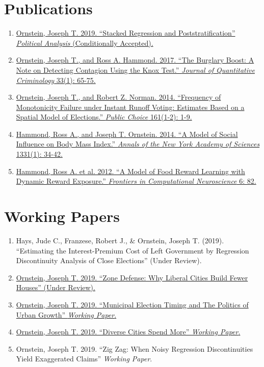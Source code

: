 \documentclass[letterpaper]{article}
\begin{document}
\hrulefill

\section*{Publications}
\begin{enumerate}
\item \href{https://joeornstein.github.io/SRP.html}{Ornstein, Joseph T. 2019. ``Stacked Regression and Poststratification'' \textit{Political Analysis} (Conditionally Accepted).} 
\item \href{https://joeornstein.github.io/papers/Ornstein-Hammond2017.pdf}{Ornstein, Joseph T., and Ross A. Hammond. 2017. ``The Burglary Boost: A Note on Detecting Contagion Using the Knox Test.'' \textit{Journal of Quantitative Criminology} 33(1): 65-75.}
\item \href{https://joeornstein.github.io/MonotonicityFailure.html}{Ornstein, Joseph T., and Robert Z. Norman. 2014. ``Frequency of Monotonicity Failure under Instant Runoff Voting: Estimates Based on a Spatial Model of Elections.'' \textit{Public Choice} 161(1-2): 1-9.}
\item \href{https://joeornstein.github.io/papers/Hammond_et_al-2014-Annals_of_the_New_York_Academy_of_Sciences.pdf}{Hammond, Ross A., and Joseph T. Ornstein. 2014. ``A Model of Social Influence on Body Mass Index.'' \textit{Annals of the New York Academy of Sciences} 1331(1): 34-42.}
\item \href{https://joeornstein.github.io/papers/Hammond-2012.pdf}{Hammond, Ross A. et al. 2012. ``A Model of Food Reward Learning with Dynamic Reward Exposure.'' \textit{Frontiers in Computational Neuroscience} 6: 82.}
\end{enumerate}

\hrulefill
\section*{Working Papers}
\begin{enumerate}
\item Hays, Jude C., Franzese, Robert J., \& Ornstein, Joseph T. (2019). ``Estimating the Interest-Premium Cost of Left Government by Regression Discontinuity Analysis of Close Elections'' (Under Review).
\item \href{https://joeornstein.github.io/papers/ornstein-zone-defense.pdf}{Ornstein, Joseph T. 2019. ``Zone Defense: Why Liberal Cities Build Fewer Houses'' (Under Review).}
\item \href{https://joeornstein.github.io/ElectionTiming.html}{Ornstein, Joseph T. 2019. ``Municipal Election Timing and The Politics of Urban Growth'' \textit{Working Paper}.}
\item \href{https://joeornstein.github.io/papers/dcsm.pdf}{Ornstein, Joseph T. 2019. ``Diverse Cities Spend More'' \textit{Working Paper}.}
\item Ornstein, Joseph T. 2019. ``Zig Zag: When Noisy Regression Discontinuities Yield Exaggerated Claims'' \textit{Working Paper}.
\end{enumerate}
\end{document}
